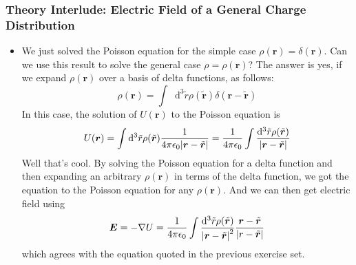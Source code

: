 \documentclass[11pt, a4paper]{article}
\newcommand{\diff}{\mathop{}\!\mathrm{d}} %
\renewcommand{\vec}[1]{\bm{#1}} %
\newcommand{\tvec}[1]{\tilde{\vec{#1}}} %
\renewcommand{\r}{\vec{r}}
\renewcommand{\grad}{\nabla}
\begin{document}
\subsubsection{Theory Interlude: Electric Field of a General Charge Distribution}
\begin{itemize}
	\item We just solved the Poisson equation for the simple case $ \rho(\r) = \delta(\r) $. Can we use this result to solve the general case $ \rho = \rho(\r) $? The answer is yes, if we expand $ \rho(\r) $ over a basis of delta functions, as follows:
	\begin{equation*}
		\rho(\r) = \int \diff^{3}\tilde{r} \rho(\tvec{r}) \delta(\r - \tvec{r})
	\end{equation*}
	In this case, the solution of $ U(\r) $ to the Poisson equation is
	\begin{equation*}
		U(\r) = \int \diff^{3}\tilde{r}\rho(\tvec{r}) \frac{1}{4\pi \epsilon_{0}\abs{\r - \tvec{r}}} = \frac{1}{4\pi \epsilon_{0}} \int\frac{\diff^{3}\tilde{r}\rho(\tvec{r})}{\abs{\r - \tvec{r}}}
	\end{equation*}
	Well that's cool. By solving the Poisson equation for a delta function and then expanding an arbitrary $ \rho(\r) $ in terms of the delta function, we got the equation to the Poisson equation for any $ \rho(\r) $. And we can then get electric field using
	\begin{equation*}
		\vec{E} = - \grad U = \frac{1}{4\pi \epsilon_{0}} \int\frac{\diff^{3}\tilde{r}\rho(\tvec{r})}{\abs{\r - \tvec{r}}^{2}} \frac{\r - \tvec{r}}{\abs{r - \tvec{r}}}
	\end{equation*}
	which agrees with the equation quoted in the previous exercise set.
\end{itemize}
\end{document}
